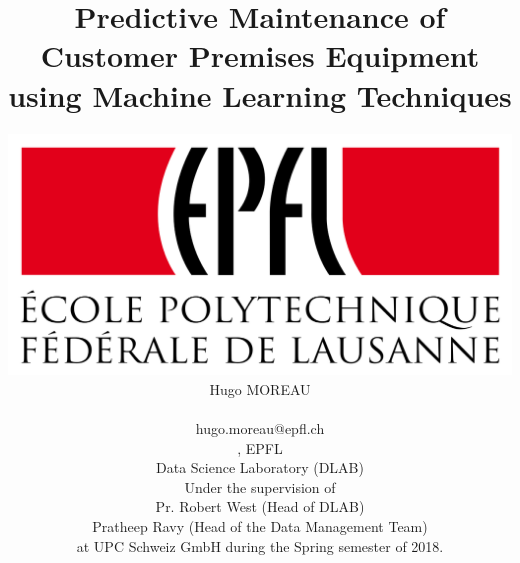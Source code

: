 \documentclass[10pt,a4paper,twocolumn]{report}
\begin{document}
\title{Predictive Maintenance of Customer Premises Equipment using Machine Learning Techniques}

\author{
	\includegraphics[width=0.2\linewidth]{EPFL}\\
	Hugo MOREAU\\
  	\begin{tt}hugo.moreau@epfl.ch\end{tt}, EPFL \\
	Data Science Laboratory (DLAB)\\
	Under the supervision of \\
	Pr. Robert West (Head of DLAB)\\
	Pratheep Ravy (Head of the Data Management Team)\\
	at UPC Schweiz GmbH during the Spring semester of 2018.
}

\maketitle{}
\setcounter{tocdepth}{3}
\tableofcontents








\printbibliography
\printglossary[type=\acronymtype]
\end{document}
